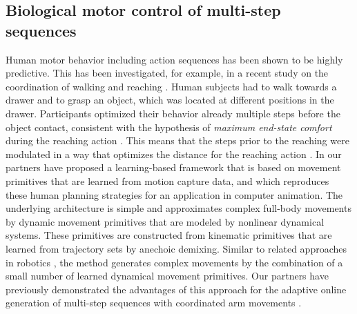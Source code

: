 \subsection{Biological motor control of multi-step sequences}
Human motor behavior including action sequences has been shown to be highly predictive.
This has been investigated, for example, in a recent study on the coordination of walking
and reaching \cite{ref:lrss13}. Human subjects had to walk towards a drawer and to
grasp an object, which was located at different positions in the drawer. Participants
optimized their behavior already multiple steps before the object contact, consistent with the
hypothesis of \emph{maximum end-state comfort} during the reaching action \cite{ref:ws10, ref:r08}.
This means that the steps prior to the reaching were modulated in a way that optimizes the distance
for the reaching action \cite{ref:lrss13}. In  \cite{ref:mlsg15} our partners have proposed a
learning-based framework that is based on movement primitives that are learned from motion capture data,
and which reproduces these human planning strategies for an application in computer animation.
The underlying architecture is simple and approximates complex full-body movements by
dynamic movement primitives that are modeled by nonlinear dynamical systems. These primitives
are constructed from kinematic primitives that are learned from trajectory sets by anechoic demixing.
Similar to  related approaches in robotics \cite{ref:gam08,ref:buc06}, the method generates complex
movements by the combination of a small number of learned dynamical movement primitives. Our partners have previously
demonstrated the advantages of this approach for the adaptive online generation of multi-step sequences
with coordinated arm movements \cite{ref:mlsg15, ref:gie09}.

